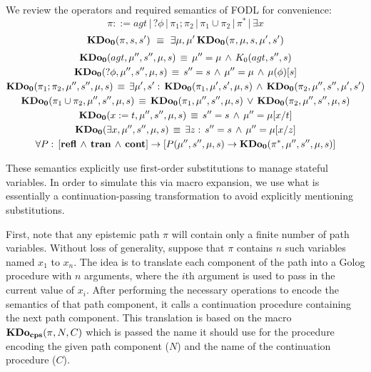 We review the operators and required semantics of FODL for convenience:\[
\pi::=agt\,|\,?\phi\,|\,\pi_{1};\pi_{2}\,|\,\pi_{1}\cup\pi_{2}\,|\,\pi^{*}\,|\,\exists x\]
 \[
\mathbf{KDo_{0}}(\pi,s,s')\,\,\equiv\,\,\exists\mu,\mu'\,\mathbf{KDo_{0}}(\pi,\mu,s,\mu',s')\]
 \begin{gather*}
\mathbf{KDo_{0}}(agt,\mu'',s'',\mu,s)\,\equiv\,\mu''=\mu\,\wedge\, K_{0}(agt,s'',s)\\
\mathbf{KDo_{0}}(?\phi,\mu'',s'',\mu,s)\,\equiv\, s''=s\,\wedge\,\mu''=\mu\,\wedge\,\mu(\phi)[s]\\
\mathbf{KDo_{0}}(\pi_{1};\pi_{2},\mu'',s'',\mu,s)\,\equiv\,\exists\mu',s':\,\mathbf{KDo_{0}}(\pi_{1},\mu',s',\mu,s)\,\wedge\,\mathbf{KDo_{0}}(\pi_{2},\mu'',s'',\mu',s')\\
\mathbf{KDo_{0}}(\pi_{1}\cup\pi_{2},\mu'',s'',\mu,s)\,\equiv\,\mathbf{KDo_{0}}(\pi_{1},\mu'',s'',\mu,s)\,\vee\,\mathbf{KDo_{0}}(\pi_{2},\mu'',s'',\mu,s)\\
\mathbf{KDo_{0}}(x:=t,\mu'',s'',\mu,s)\,\equiv\, s''=s\,\wedge\,\mu''=\mu[x/t]\\
\mathbf{KDo_{0}}(\exists x,\mu'',s'',\mu,s)\,\equiv\,\exists z:\, s''=s\,\wedge\,\mu''=\mu[x/z]\\
\forall P:\,\left[\mathbf{refl}\,\wedge\,\mathbf{tran}\,\wedge\,\mathbf{cont}\right]\rightarrow\left[P(\mu'',s'',\mu,s)\rightarrow\mathbf{KDo_{0}}(\pi^{*},\mu'',s'',\mu,s)\right]\end{gather*}


These semantics explicitly use first-order substitutions to manage
stateful variables. In order to simulate this via macro expansion,
we use what is essentially a continuation-passing transformation to
avoid explicitly mentioning substitutions.

First, note that any epistemic path $\pi$ will contain only a finite
number of path variables. Without loss of generality, suppose that
$\pi$ contains $n$ such variables named $x_{1}$ to $x_{n}$. The
idea is to translate each component of the path into a Golog procedure
with $n$ arguments, where the $i$th argument is used to pass in
the current value of $x_{i}$. After performing the necessary operations
to encode the semantics of that path component, it calls a continuation
procedure containing the next path component. This translation is
based on the macro $\mathbf{KDo_{cps}}(\pi,N,C)$ which is passed the name it should
use for the procedure encoding the given path component ($N$) and
the name of the continuation procedure ($C$).

